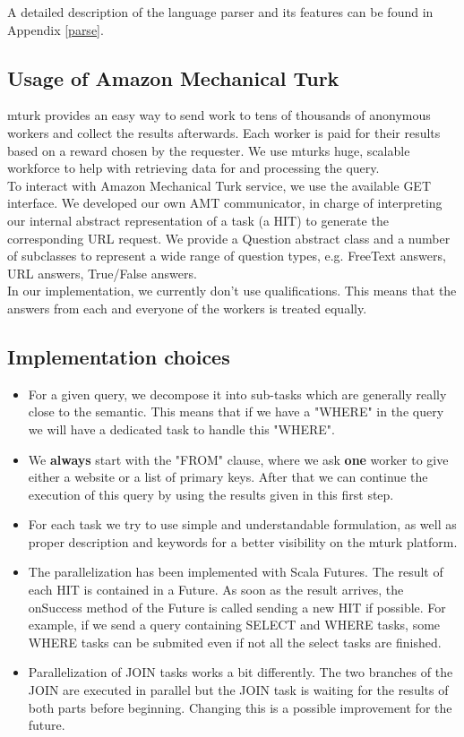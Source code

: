 \documentclass{article}
\begin{document}
A detailed description of the language parser and its features can be found in Appendix \ref{parse}.
\subsection{Usage of Amazon Mechanical Turk}
mturk provides an easy way to send work to tens of thousands of anonymous workers and collect the results afterwards. Each worker is paid for their results based on a reward chosen by the requester. We use mturks huge, scalable workforce to help with retrieving data for and processing the query. \\
To interact with Amazon Mechanical Turk service, we use the available GET interface. We developed our own AMT communicator, in charge of interpreting our internal abstract representation of a task (a HIT) to generate the corresponding URL request. We provide a Question abstract class and a number of subclasses to represent a wide range of question types, e.g. FreeText answers, URL answers, True/False answers. \\
In our implementation, we currently don't use qualifications. This means that the answers from each and everyone of the workers is treated equally.
\subsection{Implementation choices}
\begin{itemize}
\item For a given query, we decompose it into sub-tasks which are generally really close to the semantic. This means that if we have a "WHERE" in the query we will have a dedicated task to handle this "WHERE".
\item We \textbf{always} start with the "FROM" clause, where we ask \textbf{one} worker to give either a website or a list of primary keys. After that we can continue the execution of this query by using the results given in this first step.
\item For each task we try to use simple and understandable formulation, as well as proper description and keywords for a better visibility on the mturk platform. 
\item The parallelization has been implemented with Scala Futures. The result of each HIT is contained in a Future. As soon as the result arrives, the onSuccess method of the Future is called sending a new HIT if possible. For example, if we send a query containing SELECT and WHERE tasks, some WHERE tasks can be submited even if not all the select tasks are finished.
\item Parallelization of JOIN tasks works a bit differently. The two branches of the JOIN are executed in parallel but the JOIN task is waiting for the results of both parts before beginning. Changing this is a possible improvement for the future.
\end{itemize}
\end{document}

